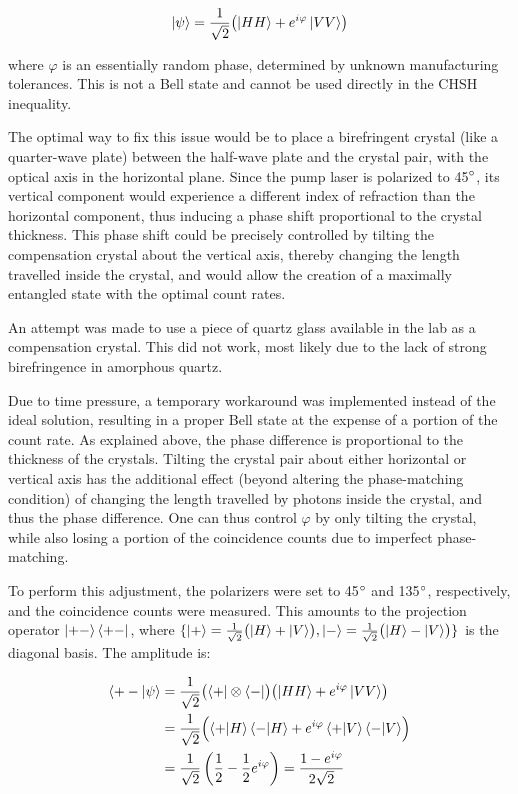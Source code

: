 \documentclass[a4paper,
DIV=13,
12pt,
BCOR=10mm,
department=FakEI,
twoside,
parskip=half,
automark,
logostyle=flat,
]{OTHRartcl}
\begin{document}
\begin{equation}
    \ket{\psi} = \frac{1}{\sqrt{2}} \bigl(\ket{HH} + e^{i \varphi} \ket{VV} \bigr)
    \label{phase_shifted_bell_state}
\end{equation}

where $\varphi$ is an essentially random phase, determined by unknown manufacturing tolerances. This is not a Bell state and cannot be used directly in the CHSH inequality.

The optimal way to fix this issue would be to place a birefringent crystal (like a quarter-wave plate) between the half-wave plate and the crystal pair, with the optical axis in the horizontal plane. Since the pump laser is polarized to 45$\degree$, its vertical component would experience a different index of refraction than the horizontal component, thus inducing a phase shift proportional to the crystal thickness. This phase shift could be precisely controlled by tilting the compensation crystal about the vertical axis, thereby changing the length travelled inside the crystal, and would allow the creation of a maximally entangled state with the optimal count rates.

An attempt was made to use a piece of quartz glass available in the lab as a compensation crystal. This did not work, most likely due to the lack of strong birefringence in amorphous quartz.

Due to time pressure, a temporary workaround was implemented instead of the ideal solution, resulting in a proper Bell state at the expense of a portion of the count rate. As explained above, the phase difference is proportional to the thickness of the crystals. Tilting the crystal pair about either horizontal or vertical axis has the additional effect (beyond altering the phase-matching condition) of changing the length travelled by photons inside the crystal, and thus the phase difference. One can thus control $\varphi$ by only tilting the crystal, while also losing a portion of the coincidence counts due to imperfect phase-matching. 

To perform this adjustment, the polarizers were set to 45$\degree$ and 135$\degree$, respectively, and the coincidence counts were measured. This amounts to the projection operator $\ket{+-}\bra{+-}$, where $\{\ket{+} = \frac{1}{\sqrt{2}} \bigl( \ket{H} + \ket{V} \bigr), \ket{-} = \frac{1}{\sqrt{2}} \bigl( \ket{H} - \ket{V} \bigr)\}$ is the diagonal basis. The amplitude is:

\begin{equation}
    \begin{split}
        \braket{+-|\psi}
        &= \frac{1}{\sqrt{2}} \bigl( \bra{+} \otimes \bra{-} \bigr)
        \bigl( \ket{HH} + e^{i\varphi} \ket{VV} \bigr) \\
        &= \frac{1}{\sqrt{2}} \Bigl(
            \braket{+|H}\braket{-|H}
            + e^{i\varphi} \braket{+|V}\braket{-|V}
        \Bigr) \\
        &= \frac{1}{\sqrt{2}} \left( \frac{1}{2} - \frac{1}{2} e^{i\varphi} \right)
        = \frac{1 - e^{i\varphi}}{2\sqrt{2}}
    \end{split}
    \label{projection_pm_amplitude}
\end{equation}
\end{document}
